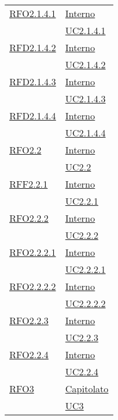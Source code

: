 \begin{longtable}{|>{\centering}m{5cm}|m{5cm}<{\centering}|}
\hyperlink{RFO2.1.4.1}{RFO2.1.4.1} & \hyperlink{Interno}{Interno}\\
& \hyperref[UC2.1.4.1]{UC2.1.4.1}\\ \hline

\hyperlink{RFD2.1.4.2}{RFD2.1.4.2} & \hyperlink{Interno}{Interno}\\
& \hyperref[UC2.1.4.2]{UC2.1.4.2}\\ \hline

\hyperlink{RFD2.1.4.3}{RFD2.1.4.3} & \hyperlink{Interno}{Interno}\\
& \hyperref[UC2.1.4.3]{UC2.1.4.3}\\ \hline

\hyperlink{RFD2.1.4.4}{RFD2.1.4.4} & \hyperlink{Interno}{Interno}\\
& \hyperref[UC2.1.4.4]{UC2.1.4.4}\\ \hline

\hyperlink{RFO2.2}{RFO2.2} & \hyperlink{Interno}{Interno}\\
& \hyperref[UC2.2]{UC2.2}\\ \hline

\hyperlink{RFF2.2.1}{RFF2.2.1} & \hyperlink{Interno}{Interno}\\
& \hyperref[UC2.2.1]{UC2.2.1}\\ \hline

\hyperlink{RFO2.2.2}{RFO2.2.2} & \hyperlink{Interno}{Interno}\\
& \hyperref[UC2.2.2]{UC2.2.2}\\ \hline

\hyperlink{RFO2.2.2.1}{RFO2.2.2.1} & \hyperlink{Interno}{Interno}\\
& \hyperref[UC2.2.2.1]{UC2.2.2.1}\\ \hline

\hyperlink{RFO2.2.2.2}{RFO2.2.2.2} & \hyperlink{Interno}{Interno}\\
& \hyperref[UC2.2.2.2]{UC2.2.2.2}\\ \hline

\hyperlink{RFO2.2.3}{RFO2.2.3} & \hyperlink{Interno}{Interno}\\
& \hyperref[UC2.2.3]{UC2.2.3}\\ \hline

\hyperlink{RFO2.2.4}{RFO2.2.4} & \hyperlink{Interno}{Interno}\\
& \hyperref[UC2.2.4]{UC2.2.4}\\ \hline

\hyperlink{RFO3}{RFO3} & \hyperlink{Capitolato}{Capitolato}\\
& \hyperref[UC3]{UC3}\\ \hline


\end{longtable}
